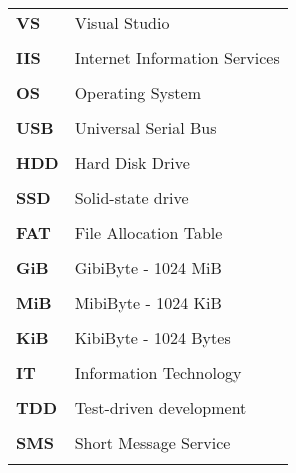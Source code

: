 \begin{longtable}{l p{10cm}}
\textbf{VS} & Visual Studio\\\\
\textbf{IIS} & Internet Information Services\\\\
\textbf{OS} & Operating System\\\\
\textbf{USB} & Universal Serial Bus\\\\
\textbf{HDD} & Hard Disk Drive\\\\
\textbf{SSD} & Solid-state drive\\\\
\textbf{FAT} & File Allocation Table\\\\
\textbf{GiB} & GibiByte - 1024 MiB\\\\
\textbf{MiB} & MibiByte - 1024 KiB\\\\
\textbf{KiB} & KibiByte - 1024 Bytes\\\\
\textbf{IT} & Information Technology\\\\
\textbf{TDD} & Test-driven development \\\\
\textbf{SMS} & Short Message Service \\\\
\end{longtable}




